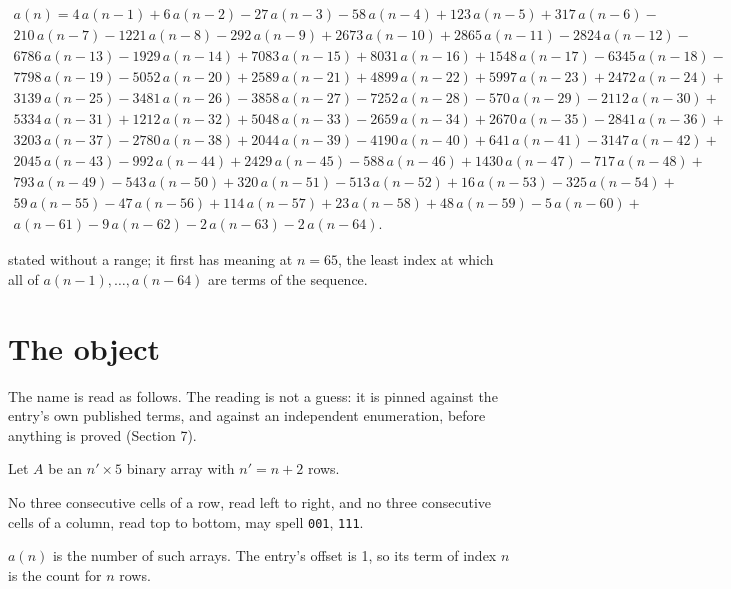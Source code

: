 \documentclass[11pt]{article}
\theoremstyle{definition}
\begin{document}
\begin{multline*} a(n) = 4\,a(n-1) + 6\,a(n-2) - 27\,a(n-3) - 58\,a(n-4) + 123\,a(n-5) + 317\,a(n-6) - \\ 210\,a(n-7) - 1221\,a(n-8) - 292\,a(n-9) + 2673\,a(n-10) + 2865\,a(n-11) - 2824\,a(n-12) - \\ 6786\,a(n-13) - 1929\,a(n-14) + 7083\,a(n-15) + 8031\,a(n-16) + 1548\,a(n-17) - 6345\,a(n-18) - \\ 7798\,a(n-19) - 5052\,a(n-20) + 2589\,a(n-21) + 4899\,a(n-22) + 5997\,a(n-23) + 2472\,a(n-24) + \\ 3139\,a(n-25) - 3481\,a(n-26) - 3858\,a(n-27) - 7252\,a(n-28) - 570\,a(n-29) - 2112\,a(n-30) + \\ 5334\,a(n-31) + 1212\,a(n-32) + 5048\,a(n-33) - 2659\,a(n-34) + 2670\,a(n-35) - 2841\,a(n-36) + \\ 3203\,a(n-37) - 2780\,a(n-38) + 2044\,a(n-39) - 4190\,a(n-40) + 641\,a(n-41) - 3147\,a(n-42) + \\ 2045\,a(n-43) - 992\,a(n-44) + 2429\,a(n-45) - 588\,a(n-46) + 1430\,a(n-47) - 717\,a(n-48) + \\ 793\,a(n-49) - 543\,a(n-50) + 320\,a(n-51) - 513\,a(n-52) + 16\,a(n-53) - 325\,a(n-54) + \\ 59\,a(n-55) - 47\,a(n-56) + 114\,a(n-57) + 23\,a(n-58) + 48\,a(n-59) - 5\,a(n-60) + \\ a(n-61) - 9\,a(n-62) - 2\,a(n-63) - 2\,a(n-64). \end{multline*}

stated without a range; it first has meaning at $n = 65$, the least index at which all of $a(n-1),\dots,a(n-64)$ are terms of the sequence.

\section{The object}

The name is read as follows. The reading is not a guess: it is pinned against the entry's own published terms, and against an independent enumeration, before anything is proved (Section 7).

Let $A$ be an $n' \times 5$ binary array with $n' = n + 2$ rows.

No three consecutive cells of a row, read left to right, and no three consecutive cells of a column, read top to bottom, may spell \texttt{001}, \texttt{111}.

$a(n)$ is the number of such arrays. The entry's offset is 1, so its term of index $n$ is the count for $n$ rows.
\end{document}
